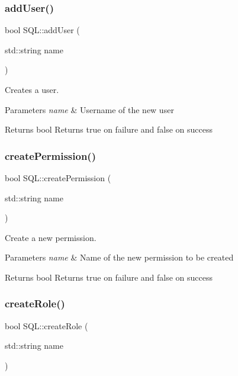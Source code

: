 \subsubsection{\texorpdfstring{add\+User()}{addUser()}}
{\footnotesize\ttfamily bool S\+Q\+L\+::add\+User (\begin{DoxyParamCaption}\item[{std\+::string}]{name }\end{DoxyParamCaption})}



Creates a user. 


\begin{DoxyParams}{Parameters}
{\em name} & Username of the new user \\
\hline
\end{DoxyParams}
\begin{DoxyReturn}{Returns}
{\ttfamily bool} Returns true on failure and false on success 
\end{DoxyReturn}
\mbox{\label{class_s_q_l_a878e54ed185a0cc9e92237da7c4032d1}} 
\subsubsection{\texorpdfstring{create\+Permission()}{createPermission()}}
{\footnotesize\ttfamily bool S\+Q\+L\+::create\+Permission (\begin{DoxyParamCaption}\item[{std\+::string}]{name }\end{DoxyParamCaption})}



Create a new permission. 


\begin{DoxyParams}{Parameters}
{\em name} & Name of the new permission to be created \\
\hline
\end{DoxyParams}
\begin{DoxyReturn}{Returns}
{\ttfamily bool} Returns true on failure and false on success 
\end{DoxyReturn}
\mbox{\label{class_s_q_l_a74e875b211592f21e4881af899e7e8a3}} 
\subsubsection{\texorpdfstring{create\+Role()}{createRole()}}
{\footnotesize\ttfamily bool S\+Q\+L\+::create\+Role (\begin{DoxyParamCaption}\item[{std\+::string}]{name }\end{DoxyParamCaption})}



